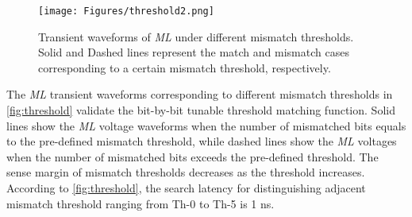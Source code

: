 

\begin{figure}
    \centering
    \texttt{[image: Figures/threshold2.png]}
    \caption{Transient waveforms of \textit{ML} under different mismatch thresholds. Solid and Dashed lines represent the match and mismatch cases corresponding to a certain mismatch threshold, respectively.}
\label{fig:threshold}
\end{figure}

The \textit{ML} transient waveforms corresponding to different mismatch thresholds in \autoref{fig:threshold} validate the bit-by-bit tunable threshold matching function.
Solid lines show the \textit{ML} voltage waveforms when the number of mismatched bits equals to the pre-defined mismatch threshold, while dashed lines show the \textit{ML} voltages when the number of mismatched bits  exceeds the pre-defined threshold. 
The sense margin of mismatch thresholds decreases as the threshold increases. 
According to \autoref{fig:threshold}, the search latency for distinguishing adjacent mismatch threshold ranging from Th-0 to Th-5  is  1 ns.



